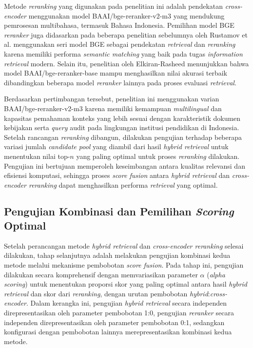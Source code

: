 Metode \textit{reranking} yang digunakan pada penelitian ini adalah pendekatan \textit{cross-encoder} menggunakan model BAAI/bge-reranker-v2-m3 yang mendukung pemrosesan multibahasa, termasuk Bahasa Indonesia. Pemilihan model BGE \textit{reranker} juga didasarkan pada beberapa penelitian sebelumnya oleh Rustamov et al. menggunakan seri model BGE sebagai pendekatan \textit{retrieval} dan \textit{reranking} karena memiliki performa \textit{semantic matching} yang baik pada tugas \textit{information retrieval} modern. Selain itu, penelitian oleh Elkiran-Rasheed menunjukkan bahwa model BAAI/bge-reranker-base mampu menghasilkan nilai akurasi terbaik dibandingkan beberapa model \textit{reranker} lainnya pada proses evaluasi \textit{retrieval}.

Berdasarkan pertimbangan tersebut, penelitian ini menggunakan varian BAAI/bge-reranker-v2-m3 karena memiliki kemampuan \textit{multilingual} dan kapasitas pemahaman konteks yang lebih sesuai dengan karakteristik dokumen kebijakan serta \textit{query} audit pada lingkungan institusi pendidikan di Indonesia. Setelah rancangan \textit{reranking} dibangun, dilakukan pengujian terhadap beberapa variasi jumlah \textit{candidate pool} yang diambil dari hasil \textit{hybrid retrieval} untuk menentukan nilai top-$n$ yang paling optimal untuk proses \textit{reranking} dilakukan. Pengujian ini bertujuan memperoleh keseimbangan antara kualitas relevansi dan efisiensi komputasi, sehingga proses \textit{score fusion} antara \textit{hybrid retrieval} dan \textit{cross-encoder reranking} dapat menghasilkan performa \textit{retrieval} yang optimal.

\subsection{Pengujian Kombinasi dan Pemilihan \textit{Scoring} Optimal}

Setelah perancangan metode \textit{hybrid retrieval} dan \textit{cross-encoder reranking} selesai dilakukan, tahap selanjutnya adalah melakukan pengujian kombinasi kedua metode melalui mekanisme pembobotan \textit{score fusion}. Pada tahap ini, pengujian dilakukan secara komprehensif dengan memvariasikan parameter $\alpha$ (\textit{alpha scoring}) untuk menentukan proporsi skor yang paling optimal antara hasil \textit{hybrid retrieval} dan skor dari \textit{reranking}, dengan urutan pembobotan \textit{hybrid}:\textit{cross-encoder}. Dalam kerangka ini, pengujian \textit{hybrid retrieval} secara independen direpresentasikan oleh parameter pembobotan 1:0, pengujian \textit{reranker} secara independen direpresentasikan oleh parameter pembobotan 0:1, sedangkan konfigurasi dengan pembobotan lainnya merepresentasikan kombinasi kedua metode.

